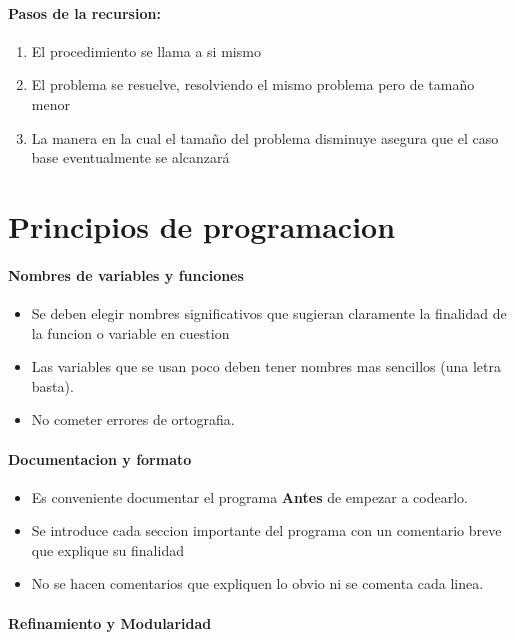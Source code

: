 \documentclass[10pt]{article}
\begin{document}
\paragraph{Pasos de la recursion:}
\begin{enumerate}
	\item El procedimiento se llama a si mismo
	\item El problema se resuelve, resolviendo el mismo problema pero de tamaño menor
	\item La manera en la cual el tamaño del problema disminuye asegura que el caso base eventualmente se alcanzará
\end{enumerate}

\section{Principios de programacion}

\paragraph{Nombres de variables y funciones}

\begin{itemize}
	\item Se deben elegir nombres significativos que sugieran claramente la finalidad de la funcion
	o variable en cuestion
	\item Las variables que se usan poco deben tener nombres mas sencillos (una letra basta).
	\item No cometer errores de ortografia.
\end{itemize}

\paragraph{Documentacion y formato}

\begin{itemize}
	\item Es conveniente documentar el programa \textbf{Antes} de empezar a codearlo.
	\item Se introduce cada seccion importante del programa con un comentario breve que explique su finalidad
	\item No se hacen comentarios que expliquen lo obvio ni se comenta cada linea.
\end{itemize}

\paragraph{Refinamiento y Modularidad}
\end{document}
